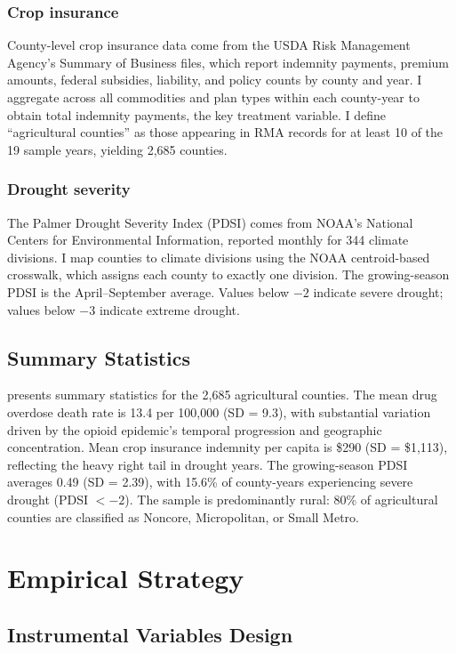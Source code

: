 \documentclass[12pt]{article}
\begin{document}
\subsubsection*{Crop insurance} County-level crop insurance data come from the USDA Risk Management Agency's Summary of Business files, which report indemnity payments, premium amounts, federal subsidies, liability, and policy counts by county and year. I aggregate across all commodities and plan types within each county-year to obtain total indemnity payments, the key treatment variable. I define ``agricultural counties'' as those appearing in RMA records for at least 10 of the 19 sample years, yielding 2,685 counties.

\subsubsection*{Drought severity} The Palmer Drought Severity Index (PDSI) comes from NOAA's National Centers for Environmental Information, reported monthly for 344 climate divisions. I map counties to climate divisions using the NOAA centroid-based crosswalk, which assigns each county to exactly one division. The growing-season PDSI is the April--September average. Values below $-2$ indicate severe drought; values below $-3$ indicate extreme drought.

\subsection{Summary Statistics}



 presents summary statistics for the 2,685 agricultural counties. The mean drug overdose death rate is 13.4 per 100,000 (SD = 9.3), with substantial variation driven by the opioid epidemic's temporal progression and geographic concentration. Mean crop insurance indemnity per capita is \$290 (SD = \$1,113), reflecting the heavy right tail in drought years. The growing-season PDSI averages 0.49 (SD = 2.39), with 15.6\% of county-years experiencing severe drought (PDSI $< -2$). The sample is predominantly rural: 80\% of agricultural counties are classified as Noncore, Micropolitan, or Small Metro.

\section{Empirical Strategy}

\subsection{Instrumental Variables Design}
\end{document}
